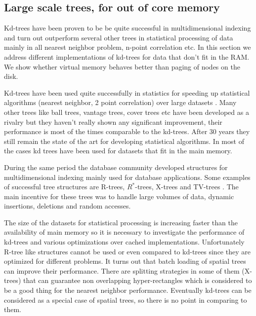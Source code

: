 \documentclass[12pt,letterpaper,doublespaced,ETD,dvips,proposal]{gtthesis}
\begin{document}
\begin{Body}

\subsection{Large scale trees, for out of core memory}
\label{Large_scale_trees}

Kd-trees have been proven to be be quite successful in
multidimensional indexing and turn out outperform several other
trees in statistical processing of data mainly in all nearest
neighbor problem, n-point correlation etc. In this section we
address different implementations of kd-trees for data that don't
fit in the RAM. We show whether virtual memory behaves better   than
paging of nodes on the disk.

Kd-trees have been used quite successfully in statistics for
speeding up statistical algorithms (nearest neighbor, 2 point
correlation) over large datasets \cite{gray2000nbp}. Many other trees like ball trees,
vantage trees, cover trees etc \cite{samet2005fma} have been developed as a rivalry but
they haven't really shown any significant improvement, their
performance is most of the times comparable to the kd-trees. After
30 years they still remain the state of the art for developing
statistical algorithms. In most of the cases kd trees have been used
for datasets that fit in the main memory.

During the same period the database community developed structures
for multidimensional indexing mainly used for database applications.
Some examples of successful tree structures are R-trees,
$R^{*}$-trees, X-trees and TV-trees \cite{samet2005fma}. The main incentive for these
trees was to handle large volumes of data, dynamic insertions,
deletions and random accesses.

The size of the datasets for statistical processing is increasing
faster than the availability of  main memory so it is necessary to
investigate the performance of kd-trees and various optimizations
over cached implementations. Unfortunately R-tree like structures
cannot be used or even compared to kd-trees since they are optimized
for different problems. It turns out that batch loading of spatial
trees can improve their performance. There are splitting strategies
in some of them (X-trees) that can guarantee non overlapping
hyper-rectangles which is considered to be a good thing for the
nearest neighbor performance. Eventually kd-trees can be considered
as a special case of spatial trees, so there is no point in
comparing to them.


\end{Body}
\end{document}
